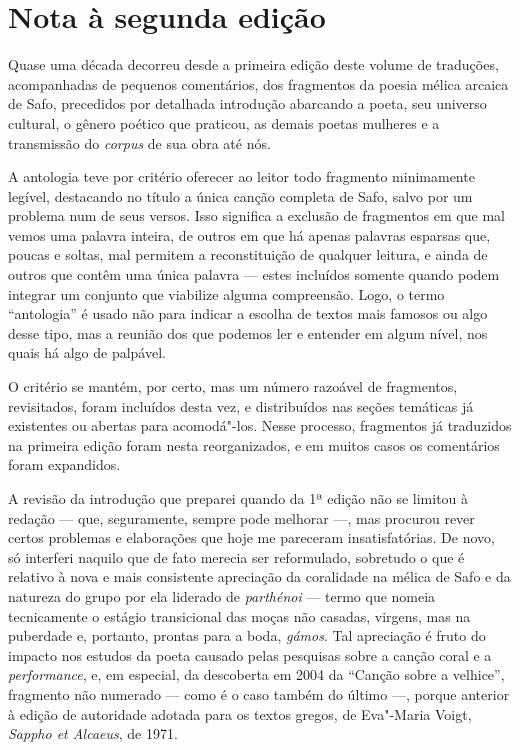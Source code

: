 \chapter{Nota à segunda edição}

\noindent{}Quase uma década decorreu desde a primeira edição deste volume de traduções,
acompanhadas de pequenos comentários, dos fragmentos da poesia mélica
arcaica de Safo, precedidos por detalhada introdução abarcando a poeta, seu
universo cultural, o gênero poético que praticou, as demais poetas
mulheres e a transmissão do \emph{corpus} de sua obra até nós.

A antologia teve por critério oferecer ao leitor todo fragmento
minimamente legível, destacando no título a única canção completa de Safo, 
salvo por um problema num de seus versos. Isso significa a exclusão de fragmentos em que mal
vemos uma palavra inteira, de outros em que há apenas
palavras esparsas que, poucas e soltas, mal permitem a reconstituição de
qualquer leitura, e ainda de outros que contêm uma única palavra ---
estes incluídos somente quando podem integrar um conjunto que viabilize
alguma compreensão. Logo, o termo ``antologia'' é usado não para indicar 
a escolha de textos mais famosos ou algo desse
tipo, mas a reunião dos que podemos ler e entender
em algum nível, nos quais há algo de palpável.

O critério se mantém, por certo, mas um número razoável de fragmentos, revisitados,
foram incluídos desta vez, e distribuídos nas seções temáticas já
existentes ou abertas para acomodá"-los. Nesse processo, fragmentos já 
traduzidos na primeira edição foram nesta reorganizados, e 
em muitos casos os comentários foram expandidos.


A revisão da introdução que preparei quando da 1ª edição não
se limitou à redação --- que, seguramente, sempre pode melhorar ---, mas
procurou rever certos problemas e elaborações que hoje me pareceram
insatisfatórias. De novo, só interferi naquilo que de fato merecia ser
reformulado, sobretudo o que é relativo à nova e mais consistente
apreciação da coralidade na mélica de Safo e da natureza do grupo por
ela liderado de \emph{parthénoi} --- termo que nomeia tecnicamente o
estágio transicional das moças não casadas, virgens, mas na puberdade
e, portanto, prontas para a boda, \emph{gámos}. Tal apreciação é fruto
do impacto nos estudos da poeta causado pelas pesquisas sobre a canção
coral e a \emph{performance}, e, em especial, da descoberta em 2004
da ``Canção sobre a velhice'', fragmento não numerado --- como é o caso também do último ---, 
porque anterior à edição de autoridade adotada para os textos gregos, 
de Eva"-Maria Voigt, \emph{Sappho et Alcaeus}, de 1971.

